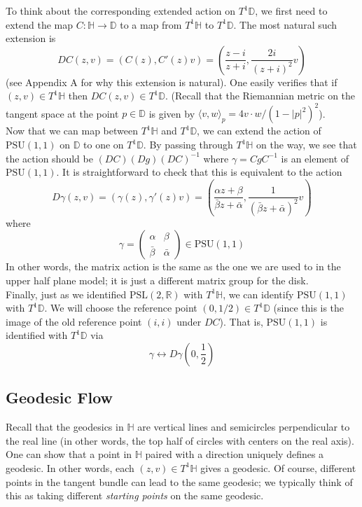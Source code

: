 \documentclass[]{article}
\begin{document}
To think about the corresponding extended action on $T^1\mathbb{D}$, we first need to extend the map $C: \mathbb{H} \rightarrow \mathbb{D}$ to a map from $T^1\mathbb{H}$ to $T^1\mathbb{D}$.
The most natural such extension is
$$
DC(z, v) = (C(z), C'(z)v) = \left( \frac{z - i}{z + i}, \frac{2i}{(z + i)^2}v \right)
$$
(see Appendix A for why this extension is natural).
One easily verifies that if $(z, v) \in T^1\mathbb{H}$ then $DC(z, v) \in T^1\mathbb{D}$.
(Recall that the Riemannian metric on the tangent space at the point $p \in \mathbb{D}$ is given by $\langle v, w \rangle_p = 4v\cdot w/(1 - |p|^2)^2$).
\\

Now that we can map between $T^1\mathbb{H}$ and $T^1\mathbb{D}$, we can extend the action of $\text{PSU}(1, 1)$ on $\mathbb{D}$ to one on $T^1\mathbb{D}$.
By passing through $T^1\mathbb{H}$ on the way, we see that the action should be $(DC)(Dg)(DC)^{-1}$ where $\gamma = CgC^{-1}$ is an element of $\text{PSU}(1, 1)$.
It is straightforward to check that this is equivalent to the action
$$
D\gamma(z, v) = (\gamma(z), \gamma'(z)v) = \left( \frac{\alpha z + \beta}{\bar{\beta}z + \bar{\alpha}}, \frac{1}{(\bar{\beta}z + \bar{\alpha})^2}v \right)
$$
where
$$
\gamma =
\begin{pmatrix}
\alpha & \beta \\
\bar{\beta} & \bar{\alpha}
\end{pmatrix} \in \text{PSU}(1, 1)
$$
In other words, the matrix action is the same as the one we are used to in the upper half plane model; it is just a different matrix group for the disk.
\\

Finally, just as we identified $\text{PSL}(2, \mathbb{R})$ with $T^1\mathbb{H}$, we can identify $\text{PSU}(1, 1)$ with $T^1\mathbb{D}$.
We will choose the reference point $(0, 1/2) \in T^1\mathbb{D}$ (since this is the image of the old reference point $(i, i)$ under $DC$).
That is, $\text{PSU}(1, 1)$ is identified with $T^1\mathbb{D}$ via
$$
\gamma \longleftrightarrow D\gamma\left( 0, \frac{1}{2} \right)
$$

\subsection*{Geodesic Flow}

Recall that the geodesics in $\mathbb{H}$ are vertical lines and semicircles perpendicular to the real line (in other words, the top half of circles with centers on the real axis).
One can show that a point in $\mathbb{H}$ paired with a direction uniquely defines a geodesic.
In other words, each $(z, v) \in T^1\mathbb{H}$ gives a geodesic.
Of course, different points in the tangent bundle can lead to the same geodesic; we typically think of this as taking different \textit{starting points} on the same geodesic.
\\
\end{document}
